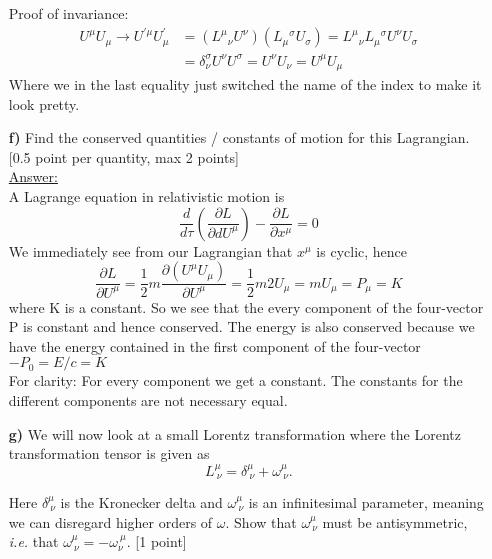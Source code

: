 \documentclass[11pt,a4paper]{report}
\newcommand{\pfrac}[2]{\frac{\partial #1}{\partial #2}}
\newcommand{\plrfrac}[2]{\left(\frac{\partial #1}{\partial #2}\right)}
\newcounter{excount}[chapter]
\newenvironment{exercise}[1][]{\addtocounter{excount}{1} \noindent {\bf Question
    \arabic{excount} \ \ #1}\hspace{2mm}}{\vspace{4mm}}
\begin{document}
\begin{exercise}{\bf A (boring) Lagrangian\\}
\begin{itemize}
Proof of invariance:
\begin{align*}
U^{\mu}U_{\mu} \rightarrow U^{\prime\mu} U^{\prime}_{ \mu} &= (L^\mu{}_{\nu} U^{\nu})(L_\mu{}^{\sigma}U_{\sigma}) = L^\mu{}_{\nu} L_\mu{}^{\sigma}U^{\nu}U_{\sigma} \\
&= \delta_{\nu}^{\sigma}U^{\nu}U^{\sigma} = U^{\nu}U_{\nu} = U^{\mu}U_{\mu}
\end{align*}
Where we in the last equality just switched the name of the index to make it look pretty.

\item[\bf f)] Find the conserved quantities / constants of motion for this Lagrangian. [0.5 point per quantity, max 2 points]\\



\underline{Answer:}\\
A Lagrange equation in relativistic motion is
\begin{equation}
\frac{d}{d\tau}\plrfrac{L}{dU^{\mu}} - \pfrac{L}{x^{\mu}} = 0
\end{equation}
We immediately see from our Lagrangian that $x^{\mu}$ is cyclic, hence 
\begin{equation}
\pfrac{L}{U^{\mu}} =\frac{1}{2}m\pfrac{(U^{\mu}U_{\mu})}{U^{\mu}}  = \frac{1}{2}m 2U_{\mu} = mU_{\mu} = P_{\mu} = K
\end{equation}
where K is a constant. So we see that the every component of the four-vector P is constant and hence conserved. The energy is also conserved because we have the energy contained in the first component of the four-vector $-P_0 = E/c = K$\\

For clarity: For every component we get a constant. The constants for the different components are not necessary equal.


\item[\bf g)] We will now look at a small Lorentz transformation where the Lorentz transformation tensor is given as
\begin{equation}
L^\mu_{\ \nu}=\delta^\mu_{\ \nu}+\omega^\mu_{\ \nu}.
\label{eq:infL}
\end{equation}

Here $\delta^\mu_{\ \nu}$ is the Kronecker delta and $\omega^\mu_{\ \nu}$ is an infinitesimal parameter, meaning we can disregard higher orders of $\omega$. Show that $\omega^\mu_{\ \nu}$  must be antisymmetric, {\it i.e.} that $\omega^\mu_{\ \nu}=-\omega_\nu^{\ \mu}$.  [1 point]\\




\end{itemize}
\end{exercise}
\end{document}
